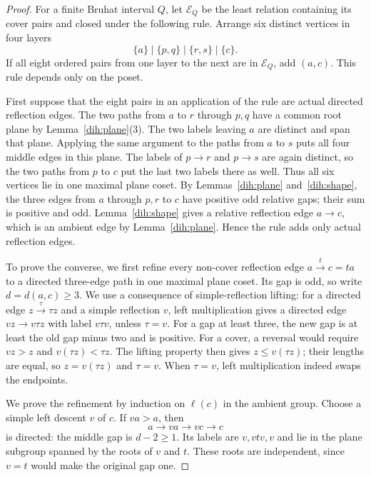 \begin{proof}
For a finite Bruhat interval $Q$, let $\mathcal E_Q$ be the least relation
containing its cover pairs and closed under the following rule. Arrange six
distinct vertices in four layers
\[
 \{a\}\mid\{p,q\}\mid\{r,s\}\mid\{c\}.
\]
If all eight ordered pairs from one layer to the next are in $\mathcal E_Q$,
add $(a,c)$. This rule depends only on the poset.

First suppose that the eight pairs in an application of the rule are actual
directed reflection edges. The two paths from $a$ to $r$ through $p,q$ have
a common root plane by Lemma~\ref{dih:plane}(3). The two labels leaving $a$
are distinct and span that plane. Applying the same argument to the paths
from $a$ to $s$ puts all four middle edges in this plane. The labels of
$p\to r$ and $p\to s$ are again distinct, so the two paths from $p$ to $c$
put the last two labels there as well. Thus all six vertices lie in one
maximal plane coset. By Lemmas~\ref{dih:plane} and~\ref{dih:shape}, the
three edges from $a$ through $p,r$ to $c$ have positive odd relative gaps;
their sum is positive and odd. Lemma~\ref{dih:shape} gives a relative
reflection edge $a\to c$, which
is an ambient edge by Lemma~\ref{dih:plane}. Hence the rule adds only actual
reflection edges.

To prove the converse, we first refine every non-cover reflection edge
$a\xrightarrow{t}c=ta$ to a directed three-edge path in one maximal plane
coset. Its gap is odd, so write $d=d(a,c)\ge3$. We use a consequence of
simple-reflection lifting: for a directed edge $z\xrightarrow{\tau}\tau z$
and a simple reflection $v$, left multiplication gives a directed edge
$vz\to v\tau z$ with label $v\tau v$, unless $\tau=v$.
For a gap at least three, the new gap is at least the old gap minus two and
is positive. For a cover, a reversal would require $vz>z$ and
$v(\tau z)<\tau z$.
The lifting property \cite[Proposition~2.2.7]{BB05} then gives
$z\le v(\tau z)$; their lengths are equal, so $z=v(\tau z)$ and $\tau=v$.
When $\tau=v$, left multiplication indeed swaps the endpoints.

We prove the refinement by induction on $\ell(c)$ in the ambient group.
Choose a simple left descent $v$ of $c$. If $va>a$, then
\[
 a\longrightarrow va\longrightarrow vc\longrightarrow c
\]
is directed: the middle gap is $d-2\ge1$. Its labels are $v,vtv,v$ and lie
in the plane subgroup spanned by the roots of $v$ and $t$. These roots are
independent, since $v=t$ would make the original gap one.


\end{proof}
